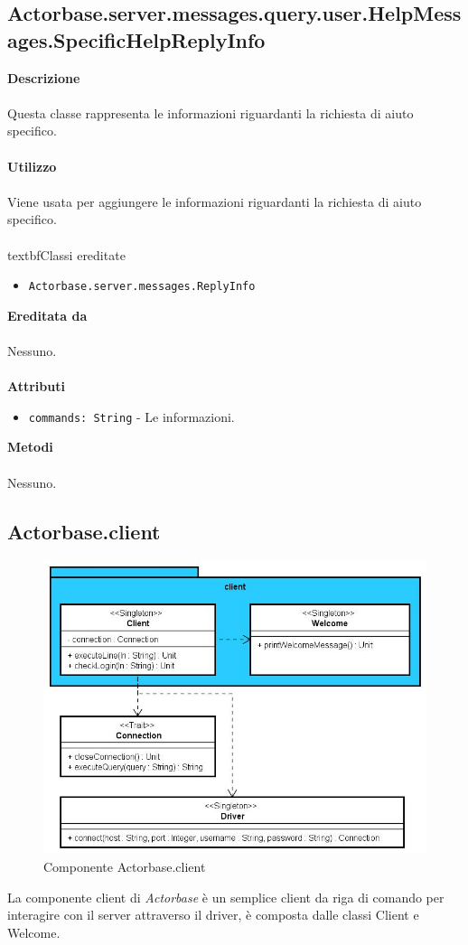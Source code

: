 \documentclass[a4paper]{article}
\begin{document}
	\subsection{Actorbase.server.messages.query.user.HelpMessages.SpecificHelpReplyInfo}
		\textbf{Descrizione}
			\\ \\
			Questa classe rappresenta le informazioni riguardanti la richiesta di aiuto specifico.
			\\ \\
		\textbf{Utilizzo}
			\\ \\
			Viene usata per aggiungere le informazioni riguardanti la richiesta di aiuto specifico.
			\\ \\
		textbf{Classi ereditate}
			\begin{itemize}
				\item \texttt{Actorbase.server.messages.ReplyInfo}
			\end{itemize}
		\textbf{Ereditata da}
			\\ \\
			Nessuno.
			\\ \\
		\textbf{Attributi}
			\begin{itemize}
				\item \texttt{commands: String} - Le informazioni.
			\end{itemize}
		\textbf{Metodi}
			\\ \\
			Nessuno.

			
	\subsection{Actorbase.client}
		\begin{figure}[H]
			\centering
			\includegraphics[scale=0.5]{Client/clientLevel.jpg}
			\caption{Componente Actorbase.client}
		\end{figure}
		La componente client di \emph{Actorbase} è un semplice client da riga di comando per interagire con il server attraverso il driver, è composta dalle classi Client e Welcome.
	
\end{document}
